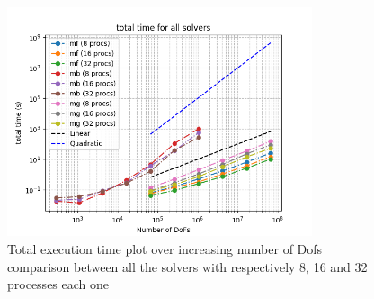 \begin{figure}[h]
    \centering
    \includegraphics[width=0.8\textwidth]{figure/time_total.png}

    \caption{Total execution time plot over increasing number of Dofs comparison between all the solvers with respectively 8, 16 and 32 processes each one}
    \label{fig:time_dim}
\end{figure}